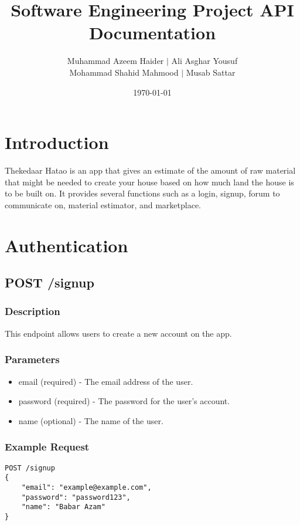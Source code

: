 \documentclass{article}
\title{Software Engineering Project API Documentation}
\author{Muhammad Azeem Haider $\mid$ Ali Asghar Yousuf \\
      Mohammad Shahid Mahmood $\mid$ Musab Sattar}
\date{\today}
\begin{document}
\maketitle

\section{Introduction}

Thekedaar Hatao is an app that gives an estimate of the amount of raw material that might be needed to create your house based on how much land the house is to be built on. It provides several functions such as a login, signup, forum to communicate on, material estimator, and marketplace.

\section{Authentication}

\subsection{POST /signup}

\subsubsection{Description}

This endpoint allows users to create a new account on the app.

\subsubsection{Parameters}

\begin{itemize}
\item email (required) - The email address of the user.
\item password (required) - The password for the user's account.
\item name (optional) - The name of the user.
\end{itemize}

\subsubsection{Example Request}

\begin{verbatim}
POST /signup
{
    "email": "example@example.com",
    "password": "password123",
    "name": "Babar Azam"
}
\end{verbatim}
\end{document}
